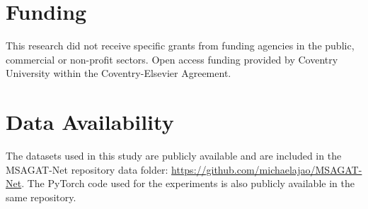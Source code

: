 \documentclass[final,1p,times]{elsarticle}
\begin{document}
\FloatBarrier

\section*{Funding}

This research did not receive specific grants from funding agencies in the public, commercial or non-profit sectors. Open access funding provided by Coventry University within the Coventry-Elsevier Agreement.



\section*{Data Availability}

The datasets used in this study are publicly available and are included in the MSAGAT-Net repository data folder: \url{https://github.com/michaelajao/MSAGAT-Net}. The PyTorch code used for the experiments is also publicly available in the same repository.




\end{document}
